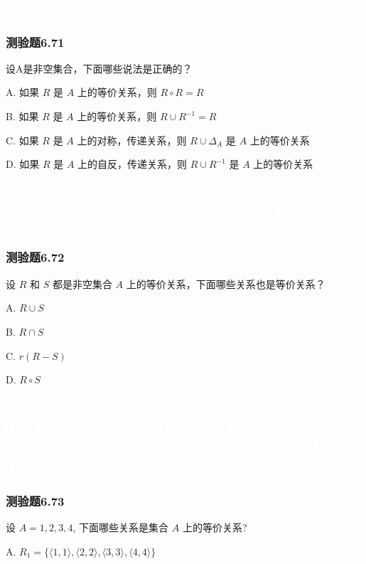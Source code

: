 \documentclass[UTF8, heading=true]{ctexart}
\begin{document}
\textcolor{white}{答案：（a）0 （b）1 （c） 1 （d） 1}

\subsubsection{测验题6.71}

设A是非空集合，下面哪些说法是正确的？

A. 如果 $R$ 是 $A$ 上的等价关系，则 $R \circ R=R$

B. 如果 $R$ 是 $A$ 上的等价关系，则 $R \cup R^{-1}=R$

C. 如果 $R$ 是 $A$ 上的对称，传递关系，则 $R \cup \Delta_A$ 是 $A$ 上的等价关系

D.  如果 $R$ 是 $A$ 上的自反，传递关系，则 $R \cup R^{-1}$ 是 $A$ 上的等价关系

\textcolor{white}{答案：ABC}

\textcolor{white}{解析：D选项反例：取$R=\{\langle 1,1\rangle, \langle 2,2\rangle, \langle 3,3\rangle , \langle 1 , 3 \rangle , \langle 2 , 3 \rangle \}$，
则$R \cup R^{-1}$破坏了传递关系。}



\subsubsection{测验题6.72}

设 $R$ 和 $S$ 都是非空集合 $A$ 上的等价关系，下面哪些关系也是等价关系？

A. $R \cup S$

B. $R \cap S$

C. $r(R-S)$

D. $R \circ S$

\textcolor{white}{答案：B}

\textcolor{white}{解析：取$R$为模2同余的关系，$S$为模3同余的关系，则 $\langle 1,3\rangle \in R \cup S$ 且 $\langle 3,6\rangle \in R \cup S$，但是 $\langle 1,6\rangle \notin R \cup S$，所以$R \cup S$不是等价关系，A选项错误；
同理，$\langle 2,4 \rangle \in r(R-S)$且$\langle 4,14 \rangle \in r(R-S)$，但是$\langle 2,14 \rangle \notin r(R-S)$，所以C选项错误。}

\subsubsection{测验题6.73}

设 $A={1,2,3,4}$, 下面哪些关系是集合 $A$ 上的等价关系?

A. $R_1=\{\langle 1,1\rangle,\langle 2,2\rangle,\langle 3,3\rangle,\langle 4,4\rangle\}$
\end{document}
